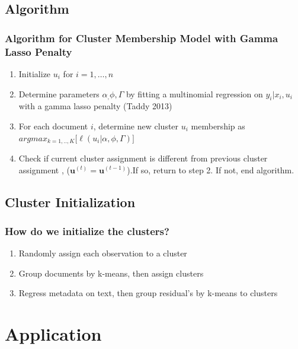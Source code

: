 \documentclass{beamer}
\begin{document}
\subsection{Algorithm}
\begin{frame}
\frametitle{Algorithm for Cluster Membership Model with Gamma Lasso Penalty}
\begin{enumerate}
\def\labelenumi{\arabic{enumi}.}
\item<+->
 Initialize $u_i$ for $i = 1, \dots, n$
\item<+->
  Determine parameters $\alpha_, \phi, \Gamma$ by fitting a multinomial
  regression on $y_i | x_i , u_i$ with a gamma lasso penalty (Taddy 2013)
\item<+->
 For each document $i$, determine new cluster $u_i$ membership as \\
  $argmax_{k = 1,..,K} \big[  \ell(u_i| \alpha, \phi, \Gamma) \big]$
\item<+->
 Check if current cluster assignment is different from previous cluster assignment , ($\textbf{u}^{(t)}  = \textbf{u}^{(t-1)}$).If so, return to step 2. If not, end algorithm.
\end{enumerate}
\end{frame}

\subsection{Cluster Initialization}
\begin{frame}
\frametitle{How do we initialize the clusters?}
\begin{enumerate}
\item<2-> Randomly assign each observation to a cluster 
\item<3-> Group documents by k-means, then assign clusters 
\item<4-> Regress metadata on text, then group residual's by k-means to clusters
\end{enumerate}
\end{frame}


\section{Application}
\end{document}
